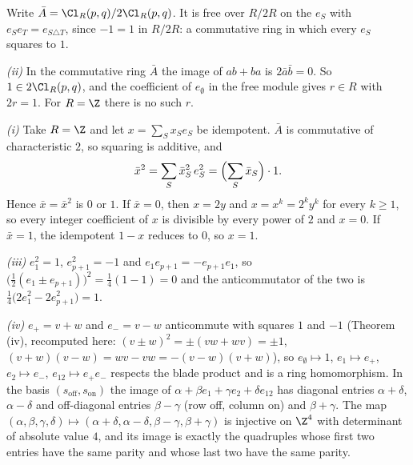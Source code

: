 Write $\bar{A} = \Cl_{R}(p,q)/2\Cl_{R}(p,q)$. It is free over $R/2R$ on the $e_{S}$ with $e_{S}e_{T} = e_{S \triangle T}$, since $-1 = 1$ in $R/2R$: a commutative ring in which every $e_{S}$ squares to $1$.

\emph{(ii)} In the commutative ring $\bar{A}$ the image of $ab + ba$ is $2\bar{a}\bar{b} = 0$. So $1 \in 2\Cl_{R}(p,q)$, and the coefficient of $e_{\emptyset}$ in the free module gives $r \in R$ with $2r = 1$. For $R = \Z$ there is no such $r$.

\emph{(i)} Take $R = \Z$ and let $x = \sum_{S} x_{S}e_{S}$ be idempotent. $\bar{A}$ is commutative of characteristic $2$, so squaring is additive, and
\[
\bar{x}^{2} = \sum_{S} \bar{x}_{S}^{2}\,e_{S}^{2} = \Bigl(\sum_{S} \bar{x}_{S}\Bigr)\cdot 1 .
\]
Hence $\bar{x} = \bar{x}^{2}$ is $0$ or $1$. If $\bar{x} = 0$, then $x = 2y$ and $x = x^{k} = 2^{k}y^{k}$ for every $k \ge 1$, so every integer coefficient of $x$ is divisible by every power of $2$ and $x = 0$. If $\bar{x} = 1$, the idempotent $1 - x$ reduces to $0$, so $x = 1$.

\emph{(iii)} $e_{1}^{2} = 1$, $e_{p+1}^{2} = -1$ and $e_{1}e_{p+1} = -e_{p+1}e_{1}$, so $\bigl(\tfrac12(e_{1} \pm e_{p+1})\bigr)^{2} = \tfrac14(1 - 1) = 0$ and the anticommutator of the two is $\tfrac14\bigl(2e_{1}^{2} - 2e_{p+1}^{2}\bigr) = 1$.

\emph{(iv)} $e_{+} = v + w$ and $e_{-} = v - w$ anticommute with squares $1$ and $-1$ (Theorem (iv), recomputed here: $(v \pm w)^{2} = \pm(vw + wv) = \pm 1$, $(v + w)(v - w) = wv - vw = -(v - w)(v + w)$), so $e_{\emptyset} \mapsto 1$, $e_{1} \mapsto e_{+}$, $e_{2} \mapsto e_{-}$, $e_{12} \mapsto e_{+}e_{-}$ respects the blade product and is a ring homomorphism. In the basis $(s_{\mathrm{off}}, s_{\mathrm{on}})$ the image of $\alpha + \beta e_{1} + \gamma e_{2} + \delta e_{12}$ has diagonal entries $\alpha + \delta$, $\alpha - \delta$ and off-diagonal entries $\beta - \gamma$ (row off, column on) and $\beta + \gamma$. The map $(\alpha, \beta, \gamma, \delta) \mapsto (\alpha + \delta, \alpha - \delta, \beta - \gamma, \beta + \gamma)$ is injective on $\Z^{4}$ with determinant of absolute value $4$, and its image is exactly the quadruples whose first two entries have the same parity and whose last two have the same parity.
